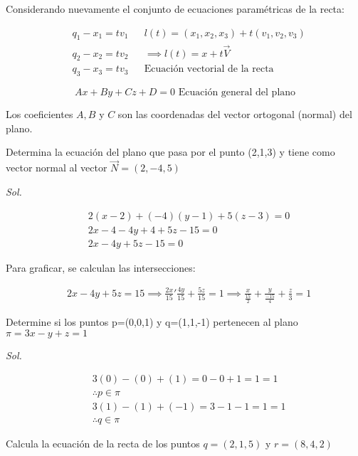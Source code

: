 Considerando nuevamente el conjunto de ecuaciones paramétricas de la recta:

\begin{align*}
	 & q_1-x_1=tv_1 &  & l(t)=(x_1,x_2,x_3)+t(v_1,v_2,v_3)     \\
	 & q_2-x_2=tv_2 &  & \implies l(t)=x+t\overrightarrow{V}   \\
	 & q_3-x_3=tv_3 &  & \text{Ecuación vectorial de la recta}
\end{align*}


\begin{equation}
	Ax+By+Cz+D=0 \text{ Ecuación general del plano}
\end{equation}

Los coeficientes $A,B$ y $C$ son las coordenadas del vector ortogonal (normal) del plano.


\begin{example}
	Determina la ecuación del plano que pasa por el punto (2,1,3) y tiene como vector normal al vector $\overrightarrow{N}=\left(2,-4,5\right)$
\end{example}

\textit{ Sol. }

\begin{align*}
	 & 2(x-2)+(-4)(y-1)+5(z-3)=0 \\
	 & 2x-4-4y+4+5z-15=0         \\
	 & 2x-4y+5z-15=0
\end{align*}

Para graficar, se calculan las intersecciones:

\begin{align*}
	 & 2x-4y+5z=15\implies \frac{2x}{15}'\frac{4y}{15}+\frac{5z}{15}=1 \implies \frac{x}{\frac{15}{2}}+\frac{y}{\frac{-15}{4}}+\frac{z}{3}=1
\end{align*}


\begin{example}
	Determine si los puntos p=(0,0,1) y q=(1,1,-1) pertenecen al plano $\pi=3x-y+z=1$
\end{example}

\textit{ Sol. }

\begin{align*}
	 & 3(0)-(0)+(1)=0-0+1=1=1  \\
	 & \therefore p\in \pi     \\
	 & 3(1)-(1)+(-1)=3-1-1=1=1 \\
	 & \therefore q\in \pi
\end{align*}

\begin{example}
	Calcula la ecuación de la recta de los puntos $q=(2,1,5)$ y $r=(8,4,2)$
\end{example}

